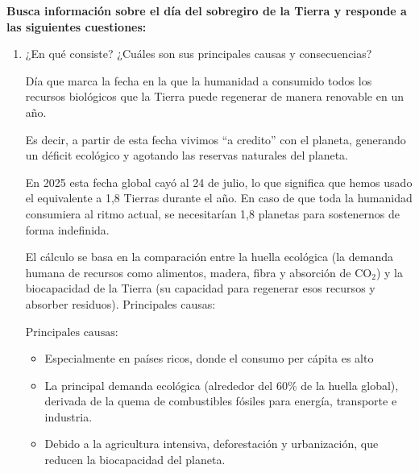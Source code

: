 \fsection{\boldit{\textcolor{waveBlue2}{Investiga}}} 

\large{\textbf{Busca información sobre el día del sobregiro de la Tierra y responde a las siguientes cuestiones:}	 
	\begin{enumerate}[label=\alph*)]
	\item{¿En qué consiste? ¿Cuáles son sus principales causas y consecuencias?}
\begin{solution}
Día que marca la fecha en la que la humanidad a consumido todos los recursos biológicos que la Tierra puede regenerar
de manera renovable en un año. 
\vspace{1em}

Es decir, a partir de esta fecha vivimos ``a credito'' con el planeta, generando un déficit
ecológico y agotando las reservas naturales del planeta. 
\vspace{1em}

En 2025 esta fecha global cayó al 24 de julio, lo que significa que hemos usado el equivalente a 1,8 Tierras durante el año.
En caso de que toda la humanidad consumiera al ritmo actual, se necesitarían 1,8 planetas para sostenernos de forma indefinida.

\vspace{1em}
El cálculo se basa en la comparación entre la huella ecológica (la demanda humana de recursos como alimentos, madera, fibra y 
absorción de CO$_2$) y la biocapacidad de la Tierra (su capacidad para regenerar esos recursos y absorber residuos).
Principales causas:
\vspace{1em}

{}
\(\boxed{\text{Principales causas:}}\)

\vspace{1em}

\begin{itemize}[label=$\bullet$]
	\item{ Especialmente en países ricos, donde el consumo per cápita es alto} 
	\item{ La principal demanda ecológica (alrededor del 60\% de la huella global), 
		derivada de la quema de combustibles fósiles para energía, transporte e industria.}
	\item{ Debido a la agricultura intensiva, deforestación y urbanización, que reducen 
	la biocapacidad del planeta.}
	

\end{itemize}
\end{solution}
\end{enumerate}}
